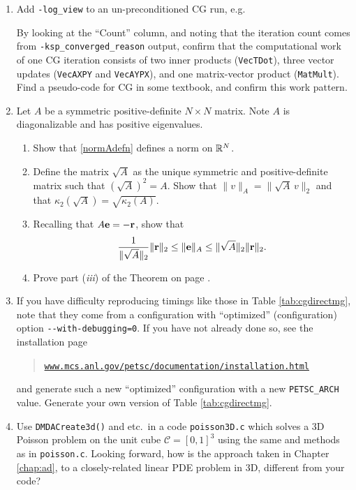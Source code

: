 \begin{enumerate}
\item Add \texttt{-log\_view} to an un-preconditioned CG run, e.g.
By looking at the ``Count'' column, and noting that the iteration count comes from \texttt{-ksp\_converged\_reason} output, confirm that the computational work of one CG iteration consists of two inner products (\texttt{VecTDot}), three vector updates (\texttt{VecAXPY} and \texttt{VecAYPX}), and one matrix-vector product (\texttt{MatMult}).  Find a pseudo-code for CG in some textbook, and confirm this work pattern.

\item \label{exer:st:Anorm} Let $A$ be a symmetric positive-definite $N\times N$ matrix.  Note $A$ is diagonalizable and has positive eigenvalues.
  \renewcommand{\labelenumii}{(\emph{\roman{enumii}})}
  \begin{enumerate}
  \item Show that \eqref{normAdefn} defines a norm on $\RR^N$.
  \item Define the matrix $$ as the unique symmetric and positive-definite matrix such that $()^2 = A$.  Show that $\|v\|_A = \|\,v\|_2$ and that $\kappa_2\left(\right) = $.
  \item Recalling that $A\be=-\br$, show that
      $$\frac{1}{\|\sqrt{A}\|_2} \|\br\|_2 \le \|\be\|_A \le \|\sqrt{A}\|_2 \|\br\|_2.$$
  \item Prove part (\emph{iii}) of the Theorem on page \pageref{thm:cgiterations}.
  \end{enumerate}

\item If you have difficulty reproducing timings like those in Table \ref{tab:cgdirectmg}, note that they come from a \PETSc configuration with ``optimized'' (configuration) option \verb|--with-debugging=0|.  If you have not already done so, see the \PETSc installation page
\begin{quote}
\href{http://www.mcs.anl.gov/petsc/documentation/installation.html}{\texttt{www.mcs.anl.gov/petsc/documentation/installation.html}}
\end{quote}
and generate such a new ``optimized'' configuration with a new \texttt{PETSC\_ARCH} value.  Generate your own version of Table \ref{tab:cgdirectmg}.

\item Use \texttt{DMDACreate3d()} and etc.~in a code \texttt{poisson3D.c} which solves a 3D Poisson problem on the unit cube $=[0,1]^3$ using the same \pDMDA and \pKSP methods as in \texttt{poisson.c}.  Looking forward, how is the approach taken in Chapter \ref{chap:ad}, to a closely-related linear PDE problem in 3D, different from your code?

\end{enumerate}
